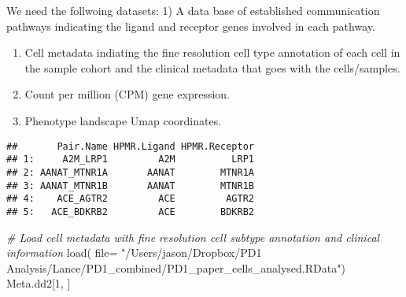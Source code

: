 \documentclass[
]{article}
\newenvironment{Shaded}{\begin{snugshade}}{\end{snugshade}}
\newcommand{\AttributeTok}[1]{\textcolor[rgb]{0.77,0.63,0.00}{#1}}
\newcommand{\CommentTok}[1]{\textcolor[rgb]{0.56,0.35,0.01}{\textit{#1}}}
\newcommand{\DecValTok}[1]{\textcolor[rgb]{0.00,0.00,0.81}{#1}}
\newcommand{\FunctionTok}[1]{\textcolor[rgb]{0.00,0.00,0.00}{#1}}
\newcommand{\NormalTok}[1]{#1}
\newcommand{\OtherTok}[1]{\textcolor[rgb]{0.56,0.35,0.01}{#1}}
\newcommand{\SpecialCharTok}[1]{\textcolor[rgb]{0.00,0.00,0.00}{#1}}
\newcommand{\StringTok}[1]{\textcolor[rgb]{0.31,0.60,0.02}{#1}}
\begin{document}
We need the follwoing datasets: 1) A data base of established
communication pathways indicating the ligand and receptor genes involved
in each pathway.

\begin{enumerate}
\def\labelenumi{\arabic{enumi})}
\setcounter{enumi}{1}
\item
  Cell metadata indiating the fine resolution cell type annotation of
  each cell in the sample cohort and the clinical metadata that goes
  with the cells/samples.
\item
  Count per million (CPM) gene expression.
\item
  Phenotype landscape Umap coordinates.
\end{enumerate}

\begin{Shaded}
\end{Shaded}

\begin{verbatim}
##       Pair.Name HPMR.Ligand HPMR.Receptor
## 1:     A2M_LRP1         A2M          LRP1
## 2: AANAT_MTNR1A       AANAT        MTNR1A
## 3: AANAT_MTNR1B       AANAT        MTNR1B
## 4:    ACE_AGTR2         ACE         AGTR2
## 5:   ACE_BDKRB2         ACE        BDKRB2
\end{verbatim}

\begin{Shaded}
\begin{Highlighting}[]
\CommentTok{\# Load cell metadata with fine resolution cell subtype annotation and clinical information}
\FunctionTok{load}\NormalTok{( }\AttributeTok{file=} \StringTok{"/Users/jason/Dropbox/PD1 Analysis/Lance/PD1\_combined/PD1\_paper\_cells\_analysed.RData"}\NormalTok{)}
\NormalTok{Meta.dd2[}\DecValTok{1}\NormalTok{, ]}
\end{Highlighting}
\end{Shaded}
\end{document}
